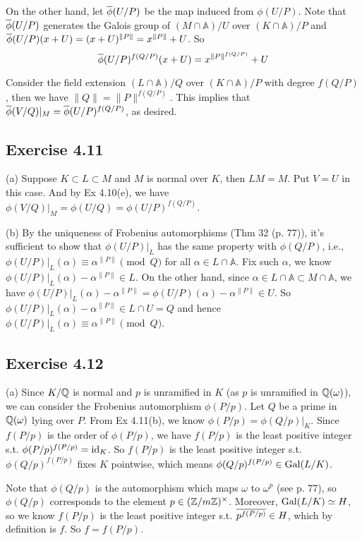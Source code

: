 \documentclass[../Marcus.tex]{subfiles}
\begin{document}
On the other hand, let $\overline{\phi}(U/P)$ be the map induced from $\phi(U/P)$. Note that $\overline{\phi}(U/P)$ generates the Galois group of $(M\cap\mathbb{A})/U$ over $(K\cap\mathbb{A})/P$ and $\overline{\phi}(U/P)(x+U)=(x+U)^{\|P\|}=x^{\|P\|}+U$. So $$\overline{\phi}(U/P)^{f(Q/P)}(x+U)=x^{\|P\|^{f(Q/P)}}+U$$

Consider the field extension $(L\cap\mathbb{A})/Q$ over $(K\cap\mathbb{A})/P$ with degree $f(Q/P)$, then we have $\|Q\|=\|P\|^{f(Q/P)}$. This implies that $\overline{\phi}(V/Q)|_M=\overline{\phi}(U/P)^{f(Q/P)}$, as desired.

\subsection*{Exercise 4.11}

(a) Suppose $K\subset L\subset M$ and $M$ is normal over $K$, then $LM=M$. Put $V=U$ in this case. And by Ex 4.10(e), we have $\phi(V/Q)|_M=\phi(U/Q)=\phi(U/P)^{f(Q/P)}$.

(b) By the uniqueness of Frobenius automorphisms (Thm 32 (p. 77)), it's sufficient to show that $\phi(U/P)|_L$ has the same property with $\phi(Q/P)$, i.e., $\phi(U/P)|_L(\alpha)\equiv\alpha^{\|P\|} \pmod{Q}$ for all $\alpha\in L\cap\mathbb{A}$. Fix such $\alpha$, we know $\phi(U/P)|_L(\alpha)-\alpha^{\|P\|}\in L$. On the other hand, since $\alpha\in L\cap\mathbb{A}\subset M\cap\mathbb{A}$, we have $\phi(U/P)|_L(\alpha)-\alpha^{\|P\|}=\phi(U/P)(\alpha)-\alpha^{\|P\|}\in U$. So $\phi(U/P)|_L(\alpha)-\alpha^{\|P\|} \in L\cap U=Q$ and hence $\phi(U/P)|_L(\alpha)\equiv\alpha^{\|P\|} \pmod{Q}$.

\subsection*{Exercise 4.12}

(a) Since $K/\mathbb{Q}$ is normal and $p$ is unramified in $K$ (as $p$ is unramified in $\mathbb{Q}(\omega)$), we can consider the Frobenius automorphism $\phi(P/p)$. Let $Q$ be a prime in $\mathbb{Q}(\omega)$ lying over $P$. From Ex 4.11(b), we know $\phi(P/p)=\phi(Q/p)|_K$. Since $f(P/p)$ is the order of $\phi(P/p)$, we have $f(P/p)$ is the least positive integer s.t. $\phi(P/p)^{f(P/p)}=\operatorname{id}_K$. So $f(P/p)$ is the least positive integer s.t. $\phi(Q/p)^{f(P/p)}$ fixes $K$ pointwise, which means $\phi(Q/p)^{f(P/p)}\in\operatorname{Gal}(L/K)$.

Note that $\phi(Q/p)$ is the automorphism which maps $\omega$ to $\omega^p$ (see p. 77), so $\phi(Q/p)$ corresponds to the element $p\in(\mathbb{Z}/m\mathbb{Z})^\times$. Moreover, $\operatorname{Gal}(L/K)\simeq H$, so we know $f(P/p)$ is the least positive integer s.t. $\overline{p^{f(P/p)}}\in H$, which by definition is $f$. So $f=f(P/p)$.
\end{document}
